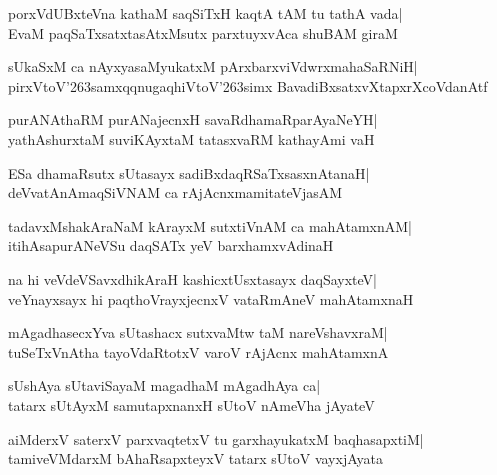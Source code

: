 \documentclass[twoside,12pt,openright]{book}
\def\S{\char'263}
\newcounter{shloka}[chapter]
\begin{document}
\begin{shloka}%
porxVdUBxteVna kathaM saqSiTxH kaqtA tAM tu tathA vada|\\
EvaM paqSaTxsatxtasAtxMsutx parxtuyxvAca shuBAM giraM
\end{shloka}

\begin{shloka}%
sUkaSxM ca nAyxyasaMyukatxM pArxbarxviVdwrxmahaSaRNiH|\\
pirxVtoV\S samxqqnugaqhiVtoV\S simx BavadiBxsatxvXtapxrXcoVdanAtf
\end{shloka}

\begin{shloka}%
purANAthaRM purANajecnxH savaRdhamaRparAyaNeYH|\\
yathAshurxtaM suviKAyxtaM tatasxvaRM kathayAmi vaH
\end{shloka}

\begin{shloka}%
ESa dhamaRsutx sUtasayx sadiBxdaqRSaTxsasxnAtanaH|\\
deVvatAnAmaqSiVNAM ca rAjAcnxmamitateVjasAM
\end{shloka}

\begin{shloka}%
tadavxMshakAraNaM kArayxM sutxtiVnAM ca mahAtamxnAM|\\
itihAsapurANeVSu daqSATx yeV barxhamxvAdinaH
\end{shloka}

\begin{shloka}%
na hi veVdeVSavxdhikAraH kashicxtUsxtasayx daqSayxteV|\\
veYnayxsayx hi paqthoVrayxjecnxV vataRmAneV mahAtamxnaH
\end{shloka}

\begin{shloka}%
mAgadhasecxYva sUtashacx sutxvaMtw taM nareVshavxraM|\\
tuSeTxVnAtha tayoVdaRtotxV varoV rAjAcnx mahAtamxnA
\end{shloka}

\begin{shloka}%
sUshAya sUtaviSayaM magadhaM mAgadhAya ca|\\
tatarx sUtAyxM samutapxnanxH sUtoV nAmeVha jAyateV
\end{shloka}

\begin{shloka}%
aiMderxV saterxV parxvaqtetxV tu garxhayukatxM baqhasapxtiM|\\
tamiveVMdarxM bAhaRsapxteyxV tatarx sUtoV vayxjAyata 
\end{shloka}
\end{document}
